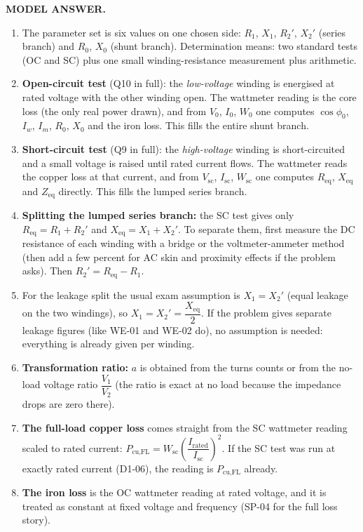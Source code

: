 \documentclass[11pt]{article}
\newcommand{\tagline}[1]{\textbf{\color{copper}#1}}
\begin{document}
\tagline{MODEL ANSWER.}
\begin{enumerate}[label=\arabic*.]
\item The parameter set is six values on one chosen side: $R_1$, $X_1$, $R_2'$, $X_2'$ (series branch) and $R_0$, $X_0$ (shunt branch). Determination means: two standard tests (OC and SC) plus one small winding-resistance measurement plus arithmetic.
\item \textbf{Open-circuit test} (Q10 in full): the \emph{low-voltage} winding is energised at rated voltage with the other winding open. The wattmeter reading is the core loss (the only real power drawn), and from $V_0$, $I_0$, $W_0$ one computes $\cos\phi_0$, $I_w$, $I_m$, $R_0$, $X_0$ and the iron loss. This fills the entire shunt branch.
\item \textbf{Short-circuit test} (Q9 in full): the \emph{high-voltage} winding is short-circuited and a small voltage is raised until rated current flows. The wattmeter reads the copper loss at that current, and from $V_{\text{sc}}$, $I_{\text{sc}}$, $W_{\text{sc}}$ one computes $R_{\text{eq}}$, $X_{\text{eq}}$ and $Z_{\text{eq}}$ directly. This fills the lumped series branch.
\item \textbf{Splitting the lumped series branch:} the SC test gives only $R_{\text{eq}} = R_1 + R_2'$ and $X_{\text{eq}} = X_1 + X_2'$. To separate them, first measure the DC resistance of each winding with a bridge or the voltmeter-ammeter method (then add a few percent for AC skin and proximity effects if the problem asks). Then $R_2' = R_{\text{eq}} - R_1$.
\item For the leakage split the usual exam assumption is $X_1 = X_2'$ (equal leakage on the two windings), so $X_1 = X_2' = \dfrac{X_{\text{eq}}}{2}$. If the problem gives separate leakage figures (like WE-01 and WE-02 do), no assumption is needed: everything is already given per winding.
\item \textbf{Transformation ratio:} $a$ is obtained from the turns counts or from the no-load voltage ratio $\dfrac{V_1}{V_2}$ (the ratio is exact at no load because the impedance drops are zero there).
\item \textbf{The full-load copper loss} comes straight from the SC wattmeter reading scaled to rated current: $P_{\text{cu,FL}} = W_{\text{sc}}\left(\dfrac{I_{\text{rated}}}{I_{\text{sc}}}\right)^{2}$. If the SC test was run at exactly rated current (D1-06), the reading is $P_{\text{cu,FL}}$ already.
\item \textbf{The iron loss} is the OC wattmeter reading at rated voltage, and it is treated as constant at fixed voltage and frequency (SP-04 for the full loss story).

\end{enumerate}
\end{document}
